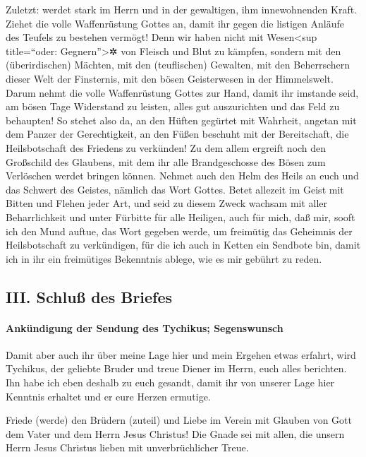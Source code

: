  Zuletzt: werdet stark im Herrn und in der gewaltigen,
ihm innewohnenden Kraft.  Ziehet die volle Waffenrüstung
Gottes an, damit ihr gegen die listigen Anläufe des Teufels zu bestehen
vermögt!  Denn wir haben nicht mit Wesen\textless sup
title=``oder: Gegnern''\textgreater✲ von Fleisch und Blut zu kämpfen,
sondern mit den (überirdischen) Mächten, mit den (teuflischen) Gewalten,
mit den Beherrschern dieser Welt der Finsternis, mit den bösen
Geisterwesen in der Himmelswelt.  Darum nehmt die volle
Waffenrüstung Gottes zur Hand, damit ihr imstande seid, am bösen Tage
Widerstand zu leisten, alles gut auszurichten und das Feld zu behaupten!
 So stehet also da, an den Hüften gegürtet mit Wahrheit,
angetan mit dem Panzer der Gerechtigkeit,  an den Füßen
beschuht mit der Bereitschaft, die Heilsbotschaft des Friedens zu
verkünden!  Zu dem allem ergreift noch den Großschild des
Glaubens, mit dem ihr alle Brandgeschosse des Bösen zum Verlöschen
werdet bringen können.  Nehmet auch den Helm des Heils an
euch und das Schwert des Geistes, nämlich das Wort Gottes.
 Betet allezeit im Geist mit Bitten und Flehen jeder Art,
und seid zu diesem Zweck wachsam mit aller Beharrlichkeit und unter
Fürbitte für alle Heiligen,  auch für mich, daß mir,
sooft ich den Mund auftue, das Wort gegeben werde, um freimütig das
Geheimnis der Heilsbotschaft zu verkündigen,  für die ich
auch in Ketten ein Sendbote bin, damit ich in ihr ein freimütiges
Bekenntnis ablege, wie es mir gebührt zu reden.

\hypertarget{iii.-schluuxdf-des-briefes}{%
\subsection{III. Schluß des Briefes}\label{iii.-schluuxdf-des-briefes}}

\hypertarget{ankuxfcndigung-der-sendung-des-tychikus-segenswunsch}{%
\paragraph{Ankündigung der Sendung des Tychikus;
Segenswunsch}\label{ankuxfcndigung-der-sendung-des-tychikus-segenswunsch}}

 Damit aber auch ihr über meine Lage hier und mein
Ergehen etwas erfahrt, wird Tychikus, der geliebte Bruder und treue
Diener im Herrn, euch alles berichten.  Ihn habe ich eben
deshalb zu euch gesandt, damit ihr von unserer Lage hier Kenntnis
erhaltet und er eure Herzen ermutige.

 Friede (werde) den Brüdern (zuteil) und Liebe im Verein
mit Glauben von Gott dem Vater und dem Herrn Jesus Christus!
 Die Gnade sei mit allen, die unsern Herrn Jesus Christus
lieben mit unverbrüchlicher Treue.
